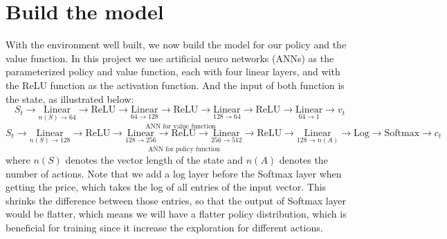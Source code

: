 \documentclass[11pt]{article}
\begin{document}
\section{Build the model}
With the environment well built, we now build the model for our policy and the
value function. In this project we use artificial neuro networks (ANNs) as the 
parameterized policy and value function, each with four linear layers, and 
with the ReLU function as the activation function. And the input of both 
function is the state, as illustrated below:
\[S_t\rightarrow\underset{\text{ANN for value function}}{
        \boxed{
            \underset{n(S)\rightarrow 64}{\text{Linear}}
            \rightarrow\text{ReLU}
            \rightarrow\underset{64\rightarrow 128}{\text{Linear}}
            \rightarrow\text{ReLU}
            \rightarrow\underset{128\rightarrow 64}{\text{Linear}}
            \rightarrow\text{ReLU}
            \rightarrow\underset{64\rightarrow 1}{\text{Linear}}
        }
}\rightarrow v_t\]
\[S_t\rightarrow\underset{\text{ANN for policy function}}{
        \boxed{
            \underset{n(S)\rightarrow 128}{\text{Linear}}
            \rightarrow\text{ReLU}
            \rightarrow\underset{128\rightarrow 256}{\text{Linear}}
            \rightarrow\text{ReLU}
            \rightarrow\underset{256\rightarrow 512}{\text{Linear}}
            \rightarrow\text{ReLU}
            \rightarrow\underset{128\rightarrow n(A)}{\text{Linear}}
        }
}\rightarrow \text{Log} \rightarrow \text{Softmax}\rightarrow c_t\]
where \(n(S)\) denotes the vector length of the state and \(n(A)\) denotes 
the number of actions. 
\vspace{3mm}\newline Note that we add a log layer before the Softmax layer 
when getting the price, which takes the log of all entries of the input vector.
This shrinks the difference between those entries, so that the output of 
Softmax layer would be flatter, which means we will have a flatter policy 
distribution, which is beneficial for training since it increase the 
exploration for different actions.
\end{document}
